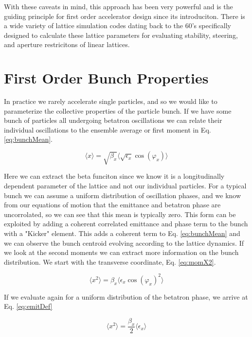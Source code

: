 With these caveats in mind, this approach has been very powerful and is the guiding principle for first order accelerator design since its introduciton. There is a wide variety of lattice simulation codes dating back to the 60's specifically designed to calculate these lattice parameters for evaluating stability, steering, and aperture restricitons of linear lattices.

\section{First Order Bunch Properties} \label{sec:bunchEmit}
In practice we rarely accelerate single particles, and so we would like to parameterize the collective properties of the particle bunch. If we have some bunch of particles all undergoing betatron oscillations we can relate their individual oscillations to the ensemble average or first moment in Eq. \ref{eq:bunchMean}.

\begin{equation} \label{eq:bunchMean}
	\langle x \rangle  = \sqrt{\beta_x} \langle \sqrt{\epsilon_x} \cos{(\varphi_x)}\rangle 
\end{equation}

Here we can extract the beta funciton since we know it is a longitudinally dependent parameter of the lattice and not our individual particles. For a typical bunch we can assume a uniform distribution of oscillation phases, and we know from our equations of motion that the emittance and betatron phase are uncorrolated, so we can see that this mean is typically zero. This form can be exploited by adding a coherent correlated emittance and phase term to the bunch with a "Kicker" element. This adds a coherent term to Eq. \ref{eq:bunchMean} and we can observe the bunch centroid evolving according to the lattice dynamics. If we look at the second moments we can extract more information on the bunch distribution. We start with the transverse coordinate, Eq. \ref{eq:momX2}.

\begin{equation} \label{eq:momX2}
	\langle x^2 \rangle = \beta_x \langle \epsilon_x \cos{(\varphi_x)}^2 \rangle
\end{equation}

If we evaluate again for a uniform distribution of the betatron phase, we arrive at Eq. \ref{eq:emitDef}

\begin{equation} \label{eq:emitDef}
	\langle x^2 \rangle = \frac{\beta_x}{2} \langle \epsilon_x \rangle
\end{equation}

